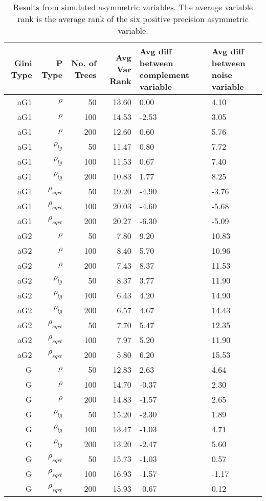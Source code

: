 \begin{table}%
  \centering
  \caption{Results from simulated asymmetric variables. The average variable rank is the average rank of the six positive precision asymmetric variable.}
\begin{tabular}{rrrrp{3cm}p{3cm}}
\hline
Gini Type & P Type & No. of Trees & Avg Var Rank & Avg diff between complement variable & Avg diff between noise variable \bigstrut\\
\hline
\renewcommand{\arraystretch}{.5}
aG1   & $\rho$ & 50    & 13.60 & 0.00  & 4.10 \bigstrut[t]\\
aG1   & $\rho$ & 100   & 14.53 & -2.53 & 3.05 \\
aG1   & $\rho$ & 200   & 12.60 & 0.60  & 5.76 \\
aG1   & $\rho_{lg}$ & 50    & 11.47 & 0.80  & 7.72 \\
aG1   & $\rho_{lg}$ & 100   & 11.53 & 0.67  & 7.40 \\
aG1   & $\rho_{lg}$ & 200   & 10.83 & 1.77  & 8.25 \\
aG1   & $\rho_{sqrt}$ & 50    & 19.20 & -4.90 & -3.76 \\
aG1   & $\rho_{sqrt}$ & 100   & 20.03 & -4.60 & -5.68 \\
aG1   & $\rho_{sqrt}$ & 200   & 20.27 & -6.30 & -5.09 \\
aG2   & $\rho$ & 50    & 7.80  & 9.20  & 10.83 \\
aG2   & $\rho$ & 100   & 8.40  & 5.70  & 10.96 \\
aG2   & $\rho$ & 200   & 7.43  & 8.37  & 11.53 \\
aG2   & $\rho_{lg}$ & 50    & 8.37  & 3.77  & 11.90 \\
aG2   & $\rho_{lg}$ & 100   & 6.43  & 4.20  & 14.90 \\
aG2   & $\rho_{lg}$ & 200   & 6.57  & 4.67  & 14.43 \\
aG2   & $\rho_{sqrt}$ & 50    & 7.70  & 5.47  & 12.35 \\
aG2   & $\rho_{sqrt}$ & 100   & 7.97  & 5.20  & 11.90 \\
aG2   & $\rho_{sqrt}$ & 200   & 5.80  & 6.20  & 15.53 \\
G     & $\rho$ & 50    & 12.83 & 2.63  & 4.64 \\
G     & $\rho$ & 100   & 14.70 & -0.37 & 2.30 \\
G     & $\rho$ & 200   & 14.83 & -1.57 & 2.65 \\
G     & $\rho_{lg}$ & 50    & 15.20 & -2.30 & 1.89 \\
G     & $\rho_{lg}$ & 100   & 13.47 & -1.03 & 4.71 \\
G     & $\rho_{lg}$ & 200   & 13.20 & -2.47 & 5.60 \\
G     & $\rho_{sqrt}$ & 50    & 15.73 & -1.03 & 0.57 \\
G     & $\rho_{sqrt}$ & 100   & 16.93 & -1.57 & -1.17 \\
G     & $\rho_{sqrt}$ & 200   & 15.93 & -0.67 & 0.12 \bigstrut[b]\\
\hline
\end{tabular}%
\label{tab:asymmetricfeaturesresults}%
\end{table}%


